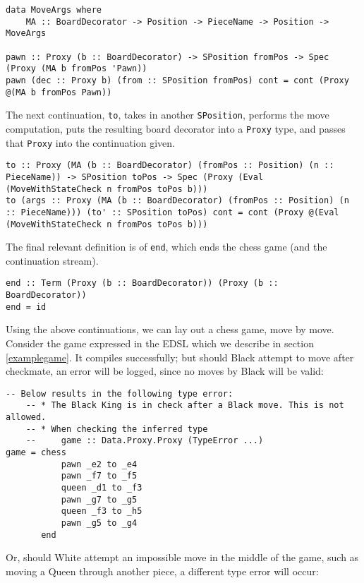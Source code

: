 \documentclass[12pt, a4paper, bibliography=totocnumbered]{scrartcl}
\begin{document}
\begin{lstlisting}
data MoveArgs where
    MA :: BoardDecorator -> Position -> PieceName -> Position -> MoveArgs

pawn :: Proxy (b :: BoardDecorator) -> SPosition fromPos -> Spec (Proxy (MA b fromPos 'Pawn))
pawn (dec :: Proxy b) (from :: SPosition fromPos) cont = cont (Proxy @(MA b fromPos Pawn))
\end{lstlisting}

The next continuation, \lstinline{to}, takes in another \lstinline{SPosition}, performs the move computation, puts the resulting board decorator into a \lstinline{Proxy} type, and passes that \lstinline{Proxy} into the continuation given.

\begin{lstlisting}
to :: Proxy (MA (b :: BoardDecorator) (fromPos :: Position) (n :: PieceName)) -> SPosition toPos -> Spec (Proxy (Eval (MoveWithStateCheck n fromPos toPos b)))
to (args :: Proxy (MA (b :: BoardDecorator) (fromPos :: Position) (n :: PieceName))) (to' :: SPosition toPos) cont = cont (Proxy @(Eval (MoveWithStateCheck n fromPos toPos b)))
\end{lstlisting}

The final relevant definition is of \lstinline{end}, which ends the chess game (and the continuation stream).

\begin{lstlisting}
end :: Term (Proxy (b :: BoardDecorator)) (Proxy (b :: BoardDecorator))
end = id
\end{lstlisting}

Using the above continuations, we can lay out a chess game, move by move. Consider the game expressed in the EDSL which we describe in section \ref{examplegame}. It compiles successfully; but should Black attempt to move after checkmate, an error will be logged, since no moves by Black will be valid:

\begin{lstlisting}
-- Below results in the following type error:
    -- * The Black King is in check after a Black move. This is not allowed.
    -- * When checking the inferred type
    --     game :: Data.Proxy.Proxy (TypeError ...)
game = chess
           pawn _e2 to _e4
           pawn _f7 to _f5
           queen _d1 to _f3
           pawn _g7 to _g5
           queen _f3 to _h5
           pawn _g5 to _g4
       end
\end{lstlisting}

Or, should White attempt an impossible move in the middle of the game, such as moving a Queen through another piece, a different type error will occur:
\end{document}
